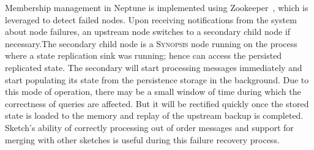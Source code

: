 Membership management in Neptune is implemented using Zookeeper~\cite{hunt2010zookeeper}, which is leveraged to detect failed nodes.
Upon receiving notifications from the system about node failures, an upstream node switches to a secondary child node if necessary.The secondary child node is a \textsc{Synopsis} node running on the process where a state replication sink was running; hence can access the persisted replicated state.
The secondary will start processing messages immediately and start populating its state from the persistence storage in the background.
Due to this mode of operation, there may be a small window of time during which the correctness of queries are affected.
But it will be rectified quickly once the stored state is loaded to the memory and replay of the upstream backup is completed.
Sketch's ability of correctly processing out of order messages and support for merging with other sketches is useful during this failure recovery process.

